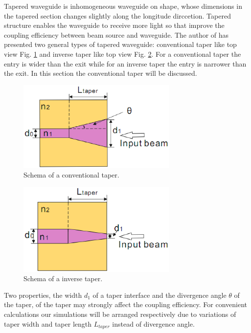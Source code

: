 Tapered waveguide is inhomogeneous waveguide on shape, whose dimensions in the tapered section changes slightly along the longitude dirccetion\cite{linear_tapered_waveguides}. Tapered structure enables the waveguide to receive more light so that improve the coupling efficiency between beam source and waveguide.  
The author of \cite{design_fabrication_tapered_waveguide} has presented two general types of tapered waveguide: conventional taper like top view Fig. \ref{fig:conventional_taper} and inverse taper like top view  Fig. \ref{fig:inverse_taper}. For a conventional taper the entry is wider than the exit while for an inverse taper the entry is narrower than the exit. In this section the conventional taper will be discussed.
\begin{figure}[!ht]
\centering
\includegraphics[width=0.7\textwidth]{bilder/convernational_taper}
\caption{Schema of a conventional taper.}
\label{fig:conventional_taper}
\end{figure}
\begin{figure}[!ht]
\centering
\includegraphics[width=0.7\textwidth]{bilder/inverse_taper}
\caption{Schema of a inverse taper.}
\label{fig:inverse_taper}
\end{figure}

Two properties, the width $d_{1}$ of a taper interface and the divergence angle $\theta$ of the taper, of the taper may strongly affect the coupling efficiency. For convenient calculations our simulations will be arranged respectively due to variations of taper width and taper length $L_{taper}$ instead of divergence angle.
